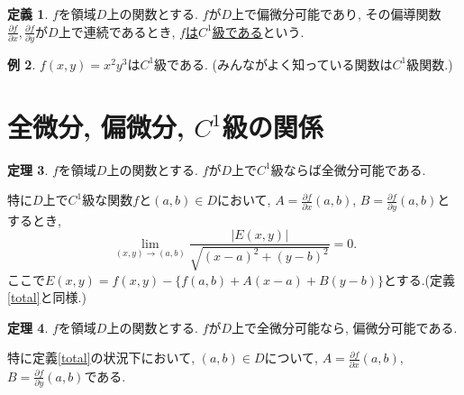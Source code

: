 \documentclass[dvipdfmx,a4paper,11pt]{article}
\theoremstyle{definition}
\newtheorem{thm}{定理}
\newtheorem{dfn}[thm]{定義}
\newtheorem{exa}[thm]{例}
\newcommand{\pdrv}[2]{\frac{\partial #1}{\partial #2}}
\begin{document}
\begin{tcolorbox}[
    colback = white,
    colframe = green!35!black,
    fonttitle = \bfseries,
    breakable = true]
    \begin{dfn}
    
    $f$を領域$D$上の関数とする.
    $f$が$D$上で偏微分可能であり, その偏導関数$\pdrv{f}{x}, \pdrv{f}{y} $が$D$上で連続であるとき, \underline{$f$は$C^1$級である}という.
     
    \end{dfn}
    \end{tcolorbox}
\begin{exa}
 $f(x,y) = x^2y^3$は$C^1$級である.
 (みんながよく知っている関数は$C^1$級関数.)
\end{exa}

\section{全微分, 偏微分, $C^1$級の関係}

\begin{tcolorbox}[
    colback = white,
    colframe = green!35!black,
    fonttitle = \bfseries,
    breakable = true]
    \begin{thm}
    
    $f$を領域$D$上の関数とする.
    $f$が$D$上で$C^1$級ならば全微分可能である.
    
    特に$D$上で$C^1$級な関数$f$と$(a,b) \in D$において, $A=\pdrv{f}{x}(a,b)$, $B=\pdrv{f}{y}(a,b)$とするとき, 
    $$\lim_{(x,y) \rightarrow (a,b)}\frac{|E(x,y)|}{\sqrt{(x-a)^2 + (y-b)^2}} =0.$$
    ここで$E(x,y) = f(x,y)-\{  f(a,b)+ A(x-a) + B(y-b)\}$とする.(定義\ref{total}と同様.)
    \end{thm}
    \end{tcolorbox}
    
    
    
\begin{tcolorbox}[
    colback = white,
    colframe = green!35!black,
    fonttitle = \bfseries,
    breakable = true]
    \begin{thm}
    
    $f$を領域$D$上の関数とする.
    $f$が$D$上で全微分可能なら, 偏微分可能である.
    
    特に定義\ref{total}の状況下において, $(a,b) \in D$について, $A=\pdrv{f}{x}(a,b)$, $B=\pdrv{f}{y}(a,b)$である.
    \end{thm}
    \end{tcolorbox}
\end{document}
